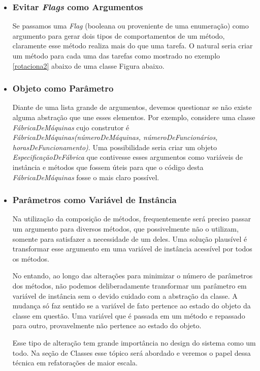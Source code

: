 \begin{itemize}
\item
\subsubsection{Evitar \textit{Flags} como Argumentos}
Se passamos uma \textit{Flag} (booleana ou proveniente de uma enumeração) como argumento para gerar dois tipos de comportamentos de um método, 
claramente esse método realiza mais do que uma tarefa. O natural seria criar um método para cada uma das tarefas como mostrado no exemplo 
\ref{rotaciona2} abaixo de uma classe Figura abaixo.




\item
\subsubsection{Objeto como Parâmetro}
\label{metodos:objeto_parametro}
Diante de uma lista grande de argumentos, devemos questionar se não existe alguma abstração que une esses elementos. Por exemplo, considere uma classe \textit{FábricaDeMáquinas} cujo construtor é \textit{FábricaDeMáquinas(númeroDeMáquinas, númeroDeFuncionários, horasDeFuncionamento)}. Uma possibilidade seria criar um objeto \textit{EspecificaçãoDeFábrica} que contivesse esses argumentos como variáveis de instância e métodos que fossem úteis para que o código desta \textit{FábricaDeMáquinas} fosse o mais claro possível.

\item
\subsubsection{Parâmetros como Variável de Instância}
\label{metodos:parametros}
Na utilização da composição de métodos, frequentemente será preciso passar um argumento para diversos métodos, que 
possivelmente não o utilizam, somente para satisfazer a necessidade de um deles. Uma solução plausível é transformar esse 
argumento em uma variável de instância acessível por todos os métodos.

No entando, ao longo das alterações para minimizar o número de parâmetros dos métodos, não podemos
deliberadamente transformar um parâmetro em variável de instância sem o devido cuidado
com a abstração da classe. A mudança só faz sentido se a variável de fato pertence ao 
estado do objeto da classe em questão. Uma variável que é passada em um método e repassado
para outro, provavelmente não pertence ao estado do objeto.

Esse tipo de alteração tem grande importância no design do sistema como um todo. Na seção de Classes esse tópico será abordado e veremos o papel dessa técnica em refatorações de maior escala.
\end{itemize}


